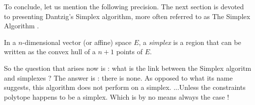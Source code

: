 To conclude, let us mention the following precision. The next section is devoted to presenting Dantzig's Simplex algorithm, more often referred to as \og The Simplex Algorithm \fg. 

\begin{definition}[Simplex]
    In a $ n $-dimensional vector (or affine) space $ E $, a \textit{simplex} is a region that can be written as the convex hull of a $ n + 1 $ points of $ E $.
\end{definition}

So the question that arises now is : what is the link between the Simplex algoritm and simplexes ? The answer is : there is none. As opposed to what its name suggests, this algorithm does not perform on a simplex. ...Unless the constraints polytope happens to be a simplex. Which is by no means always the case !